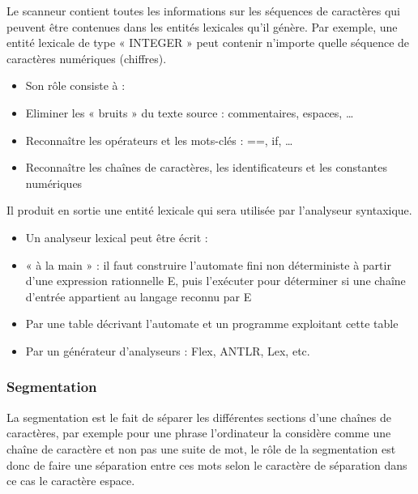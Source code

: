 \documentclass{article}
\begin{document}
Le scanneur contient toutes les informations sur les séquences de caractères qui peuvent être contenues dans les entités lexicales qu'il génère. Par exemple, une entité lexicale de type « INTEGER » peut contenir n'importe quelle séquence de caractères numériques (chiffres).
\begin{itemize}
\item Son rôle consiste à :
			\item Eliminer les « bruits » du texte source : commentaires, espaces, …
			\item Reconnaître les opérateurs et les mots-clés : ==, if, …
			\item Reconnaître les chaînes de caractères, les identificateurs et les constantes numériques
\end{itemize}
Il produit en sortie une entité lexicale qui sera utilisée par l'analyseur syntaxique.
\begin{itemize}
\item Un analyseur lexical peut être écrit :
			\item « à la main » : il faut construire l'automate fini non déterministe à partir d'une expression rationnelle E, puis l'exécuter pour déterminer si une chaîne d'entrée appartient au langage reconnu par E
			\item Par une table décrivant l'automate et un programme exploitant cette table
			\item Par un générateur d'analyseurs : Flex, ANTLR, Lex, etc.
\end{itemize}    

\subsubsection{Segmentation}
La segmentation est le fait de séparer les différentes sections d’une chaînes de caractères, par exemple pour une phrase l’ordinateur la considère comme une chaîne de caractère et non pas une suite de mot, le rôle de la segmentation est donc de faire une séparation entre ces mots selon le caractère de séparation dans ce cas le caractère espace.
\end{document}
